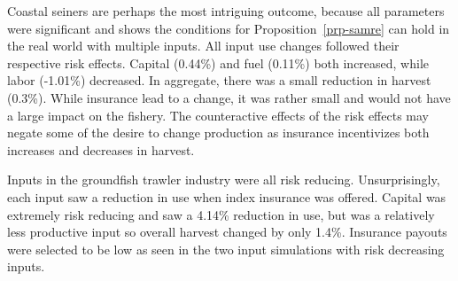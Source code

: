 \documentclass[
  letterpaper,
  DIV=11,
  numbers=noendperiod]{scrartcl}
\theoremstyle{plain}
\theoremstyle{plain}
\theoremstyle{remark}
\begin{document}
Coastal seiners are perhaps the most intriguing outcome, because all
parameters were significant and shows the conditions for
Proposition~\ref{prp-samre} can hold in the real world with multiple
inputs. All input use changes followed their respective risk effects.
Capital (0.44\%) and fuel (0.11\%) both increased, while labor (-1.01\%)
decreased. In aggregate, there was a small reduction in harvest (0.3\%).
While insurance lead to a change, it was rather small and would not have
a large impact on the fishery. The counteractive effects of the risk
effects may negate some of the desire to change production as insurance
incentivizes both increases and decreases in harvest.

Inputs in the groundfish trawler industry were all risk reducing.
Unsurprisingly, each input saw a reduction in use when index insurance
was offered. Capital was extremely risk reducing and saw a 4.14\%
reduction in use, but was a relatively less productive input so overall
harvest changed by only 1.4\%. Insurance payouts were selected to be low
as seen in the two input simulations with risk decreasing inputs.
\end{document}
